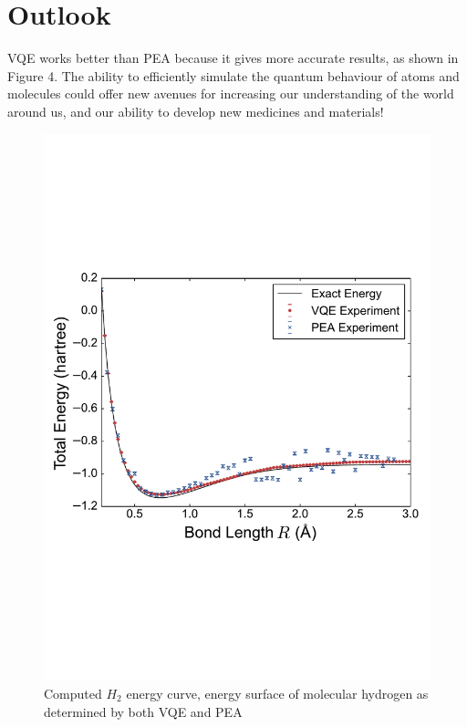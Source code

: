 \documentclass[14pt,landscape,color=UCLdarkred,margin=3cm]{uclposter}
\begin{document}
\begin{multicols}{3}
\begin{figure}[H]
   
\end{figure}



\section*{Outlook}

VQE works better than PEA because it gives more accurate results, as shown in Figure 4. The ability to efficiently simulate the quantum behaviour of atoms and molecules could offer new avenues for increasing our understanding of the world around us, and our ability to develop new medicines and materials!

\begin{figure}[H]
  \begin{center}
  \includegraphics[scale=1.45]{result.pdf}
  \caption{Computed $H_2$ energy curve, energy surface of molecular hydrogen as determined by both VQE and PEA}
  \end{center}
    
 

   
\end{figure}



\end{multicols}
	
\end{document}
